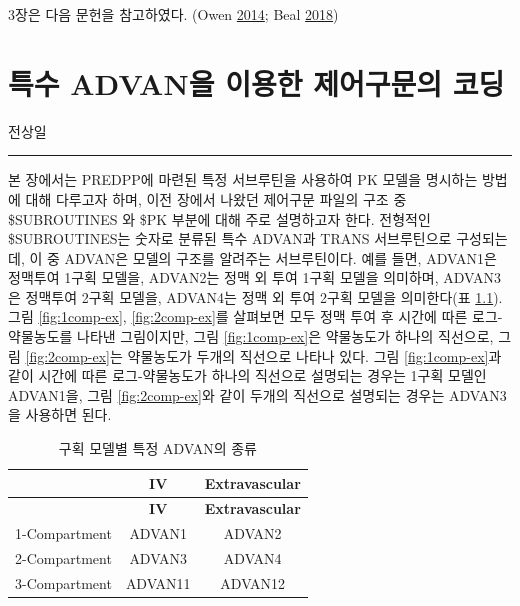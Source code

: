 \documentclass[
  10pt,
  krantz2,
  a4paper]{krantz}
\theoremstyle{definition}
\theoremstyle{definition}
\theoremstyle{definition}
\theoremstyle{remark}
\begin{document}
3장은 다음 문헌을 참고하였다. (Owen \protect\hyperlink{ref-kelly}{2014}; Beal \protect\hyperlink{ref-nonmem}{2018})

\hypertarget{specific-advan}{%
\chapter{특수 ADVAN을 이용한 제어구문의 코딩}\label{specific-advan}}


전상일

\begin{center}\rule{0.5\linewidth}{0.5pt}\end{center}

본 장에서는 PREDPP에 마련된 특정 서브루틴을 사용하여 PK 모델을 명시하는 방법에 대해 다루고자 하며, 이전 장에서 나왔던 제어구문 파일의 구조 중 \$SUBROUTINES 와 \$PK 부분에 대해 주로 설명하고자 한다. 전형적인 \$SUBROUTINES는 숫자로 분류된 특수 ADVAN과 TRANS 서브루틴으로 구성되는데, 이 중 ADVAN은 모델의 구조를 알려주는 서브루틴이다. 예를 들면, ADVAN1은 정맥투여 1구획 모델을, ADVAN2는 정맥 외 투여 1구획 모델을 의미하며, ADVAN3은 정맥투여 2구획 모델을, ADVAN4는 정맥 외 투여 2구획 모델을 의미한다(표 \ref{tab:specific-advan}). 그림 \ref{fig:1comp-ex}, \ref{fig:2comp-ex}를 살펴보면 모두 정맥 투여 후 시간에 따른 로그-약물농도를 나타낸 그림이지만, 그림 \ref{fig:1comp-ex}은 약물농도가 하나의 직선으로, 그림 \ref{fig:2comp-ex}는 약물농도가 두개의 직선으로 나타나 있다. 그림 \ref{fig:1comp-ex}과 같이 시간에 따른 로그-약물농도가 하나의 직선으로 설명되는 경우는 1구획 모델인 ADVAN1을, 그림 \ref{fig:2comp-ex}와 같이 두개의 직선으로 설명되는 경우는 ADVAN3을 사용하면 된다.

\begin{longtable}[]{@{}ccc@{}}
\caption{\label{tab:specific-advan} 구획 모델별 특정 ADVAN의 종류}\tabularnewline
\toprule
& \textbf{IV} & \textbf{Extravascular}\tabularnewline
\midrule
\endfirsthead
\toprule
& \textbf{IV} & \textbf{Extravascular}\tabularnewline
\midrule
\endhead
1-Compartment & ADVAN1 & ADVAN2\tabularnewline
2-Compartment & ADVAN3 & ADVAN4\tabularnewline
3-Compartment & ADVAN11 & ADVAN12\tabularnewline
\bottomrule
\end{longtable}
\end{document}
